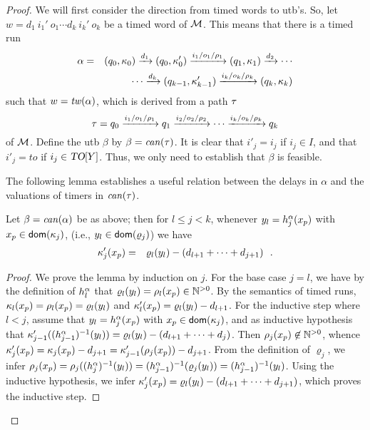 \begin{proof}
  We will first consider the direction from timed words to utb's. So, let
  $w =  d_1 ~ i_1' ~ o_1 \cdots d_k ~ i_k' ~ o_k$ be a timed word of ${\mathcal M}$.
  This means that there is a timed run
  \begin{eqnarray*}
\alpha & = & (q_0,\kappa_0) \xrightarrow{d_1} (q_0,\kappa_0') \xrightarrow{i_1/o_1/\rho_1} (q_1,\kappa_1) \xrightarrow{d_2} 
\cdots
\\ && \qquad \cdots
\xrightarrow{d_k} (q_{k-1},\kappa_{k-1}') \xrightarrow{i_k/o_k/\rho_k} (q_k,\kappa_k)
\end{eqnarray*}
  such that $w = \mathit{tw}(\alpha)$, which is derived from a path $\tau$
  \[
\tau = q_0 \xrightarrow{i_1/o_1/\rho_1} q_1  \xrightarrow{i_2/o_2/\rho_2}
\cdots
\xrightarrow{i_k/o_k/\rho_k} q_k
\]
of ${\mathcal M}$. Define the utb $\beta$ by $\beta=\mathit{can}({\tau})$. It is clear that
$i'_j   =   i_j$ if $i_j \in I$, and that
$i'_j   = \mathit{to}$ if $i_j \in \mbox{\sl TO}[Y]$. Thus, we only need
to establish that $\beta$ is feasible. 

The following lemma establishes a useful relation between the delays in $\alpha$
and the valuations of timers in $\mathit{can}({\tau})$.

\begin{lemma}
  \label{lem:timerval}
Let $\beta = \mathit{can}({\alpha})$ be as above; then 
for $l \leq j < k$,
whenever 
$y_l = h_{j}^{\alpha}(x_p)$ with $x_p \in {\textsf{dom}}(\kappa_j)$, 
(i.e., $y_l \in {\textsf{dom}}(\varrho_{j})$) we have
\begin{eqnarray*}
 \kappa_{j}'(x_p) & = &  \varrho_l(y_l) - (d_{l+1} + \cdots + d_{j+1})
 \ \ .
\end{eqnarray*}
\end{lemma}

\begin{proof}
We prove the lemma by induction on $j$.
  For the base case $j = l$, we have
 by the definition of $h_{l}^{\alpha}$ that
 $\varrho_l(y_l) = \rho_l(x_p) \in {\mathbb N}^{>0}$. By the semantics of timed runs,
 $\kappa_l(x_p) =  \rho_l(x_p) = \varrho_l(y_l)$ and
 $\kappa_l'(x_p) =  \varrho_l(y_l) - d_{l+1}$.
 For the inductive step where $l < j$, assume that
 $y_l = h_{j}^{\alpha}(x_p)$ with $x_p \in {\textsf{dom}}(\kappa_j)$, and
 as inductive hypothesis that
 $\kappa_{j-1}'((h_{j-1}^{\alpha})^{-1}(y_l)) =
 \varrho_l(y_l) - (d_{l+1} + \cdots + d_{j})$.
 Then $\rho_{j}(x_p) \not\in {\mathbb N}^{>0}$, whence
 $\kappa_{j}'(x_p) =  \kappa_{j}(x_p) -d_{j+1} = 
 \kappa_{j-1}'(\rho_{j}(x_p)) - d_{j+1}$.
 From the definition of $\varrho_{j}$, we infer
 $\rho_{j}(x_p) = \rho_{j}((h_{j}^{\alpha})^{-1}(y_l)) =
 (h_{j-1}^{\alpha})^{-1}(\varrho_{j}(y_l)) =
 (h_{j-1}^{\alpha})^{-1}(y_l)$. Using the inductive hypothesis, we infer
 $\kappa_{j}'(x_p) =
 \varrho_l(y_l) - (d_{l+1} + \cdots + d_{j+1})$, which proves the inductive
 step.
\end{proof}


\end{proof}

